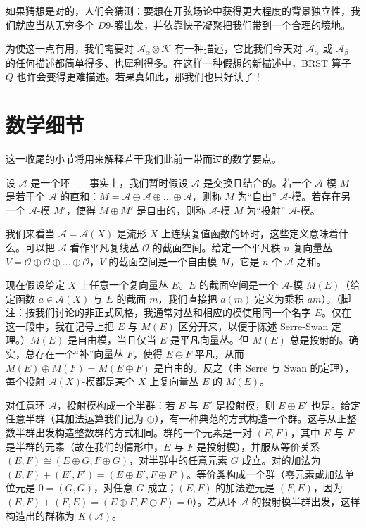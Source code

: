 如果猜想是对的，人们会猜测：要想在开弦场论中获得更大程度的背景独立性，我们就应当从无穷多个 \(D9\)-膜出发，并依靠快子凝聚把我们带到一个合理的境地。

为使这一点有用，我们需要对 \({\mathcal A}_\alpha\otimes{\mathcal K}\) 有一种描述，它比我们今天对 \({\mathcal A}_\alpha\) 或 \({\mathcal A}_\beta\) 的任何描述都简单得多、也犀利得多。在这样一种假想的新描述中，BRST 算子 \(Q\) 也许会变得更难描述。若果真如此，那我们也只好认了！

\section{数学细节}

这一收尾的小节将用来解释若干我们此前一带而过的数学要点。

设 \({\mathcal A}\) 是一个环——事实上，我们暂时假设 \({\mathcal A}\) 是交换且结合的。若一个 \({\mathcal A}\)-模 \(M\) 是若干个 \({\mathcal A}\) 的直和：\(M={\mathcal A}\oplus {\mathcal A}\oplus \dots\oplus {\mathcal A}\)，则称 \(M\) 为“自由” \({\mathcal A}\)-模。若存在另一个 \({\mathcal A}\)-模 \(M'\)，使得 \(M\oplus M'\) 是自由的，则称 \({\mathcal A}\)-模 \(M\) 为“投射” \({\mathcal A}\)-模。

我们来看当 \({\mathcal A}={\mathcal A}(X)\) 是流形 \(X\) 上连续复值函数的环时，这些定义意味着什么。可以把 \({\mathcal A}\) 看作平凡复线丛 \({\mathcal O}\) 的截面空间。给定一个平凡秩 \(n\) 复向量丛 \(V={\mathcal O}\oplus {\mathcal O}\oplus \dots\oplus{\mathcal O}\)，\(V\) 的截面空间是一个自由模 \(M\)，它是 \(n\) 个 \({\mathcal A}\) 之和。

现在假设给定 \(X\) 上任意一个复向量丛 \(E\)。\(E\) 的截面空间是一个 \({\mathcal A}\)-模 \(M(E)\)（给定函数 \(a\in {\mathcal A}(X)\) 与 \(E\) 的截面 \(m\)，我们直接把 \(a(m)\) 定义为乘积 \(am\)）。（脚注：按我们讨论的非正式风格，我通常对丛和相应的模使用同一个名字 \(E\)。仅在这一段中，我在记号上把 \(E\) 与 \(M(E)\) 区分开来，以便于陈述 Serre-Swan 定理。）\(M(E)\) 是自由模，当且仅当 \(E\) 是平凡向量丛。但 \(M(E)\) 总是投射的。确实，总存在一个“补”向量丛 \(F\)，使得 \(E\oplus F\) 平凡，从而 \(M(E)\oplus M(F)=M(E\oplus F)\) 是自由的。反之（由 Serre 与 Swan 的定理），每个投射 \({\mathcal A}(X)\)-模都是某个 \(X\) 上复向量丛 \(E\) 的 \(M(E)\)。

对任意环 \({\mathcal A}\)，投射模构成一个半群：若 \(E\) 与 \(E'\) 是投射模，则 \(E\oplus E'\) 也是。给定任意半群（其加法运算我们记为 \(\oplus\)），有一种典范的方式构造一个群。这与从正整数半群出发构造整数群的方式相同。群的一个元素是一对 \((E,F)\)，其中 \(E\) 与 \(F\) 是半群的元素（故在我们的情形中，\(E\) 与 \(F\) 是投射模），并服从等价关系 \((E,F)\cong (E\oplus G,F\oplus G)\)，对半群中的任意元素 \(G\) 成立。对的加法为 \((E,F)+(E',F')=(E\oplus E',F\oplus F')\)。等价类构成一个群（零元素或加法单位元是 \(0=(G,G)\)，对任意 \(G\) 成立；\((E,F)\) 的加法逆元是 \((F,E)\)，因为 \((E,F)+(F,E)=(E\oplus F,E\oplus F)=0\)）。若从环 \({\mathcal A}\) 的投射模半群出发，这样构造出的群称为 \(K({\mathcal A})\)。

